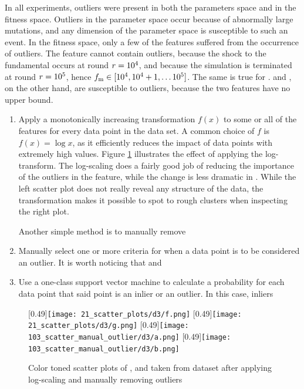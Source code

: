 In all experiments, outliers were present in both the parameters space and in the fitness space. Outliers in the parameter space occur because of abnormally large mutations, and any dimension of the parameter space is susceptible to such an event. In the fitness space, only a few of the features suffered from the occurrence of outliers. The feature \roundstable cannot contain outliers, because the shock to the fundamental occurs at round $r = 10^4$, and because the simulation is terminated at round $r = 10^5$, hence $f_\text{m} \in [10^4,10^4+1,\hdots 10^5]$. The same is true for \timetoreachnewfundamental. \stdev and \overshoot, on the other hand, are susceptible to outliers, because the two features have no upper bound.


\begin{enumerate}
\item Apply a monotonically increasing transformation $f(x)$ to some or all of the features for every data point in the data set. A common choice of $f$ is $f(x) = \log x$, as it efficiently reduces the impact of data points with extremely high values. Figure \ref{figure:scatter_log_transform} illustrates the effect of applying the log-transform. The log-scaling does a fairly good job of reducing the importance of the outliers in the \stdev feature, while the change is less dramatic in \timetoreachnewfundamental. While the left scatter plot does not really reveal any structure of the data, the transformation makes it possible to spot to rough clusters when inspecting the right plot.

Another simple method is to manually remove 
\item Manually select one or more criteria for when a data point is to be considered an outlier. It is worth noticing that \overshoot and \stdev 
\item Use a one-class support vector machine to calculate a probability for each data point that said point is an inlier or an outlier. In this case, inliers 
\end{enumerate}

\begin{figure}\label{figure:scatter_log_transform}
[0.49\linewidth]{\texttt{[image: 21\_scatter\_plots/d3/f.png]}}
[0.49\linewidth]{\texttt{[image: 21\_scatter\_plots/d3/g.png]}}
[0.49\linewidth]{\texttt{[image: 103\_scatter\_manual\_outlier/d3/a.png]}}
[0.49\linewidth]{\texttt{[image: 103\_scatter\_manual\_outlier/d3/b.png]}}
\caption{Color toned scatter plots of \timetoreachnewfundamental, \stdev and \roundstable taken from dataset \dthree after applying log-scaling and manually removing outliers}
\end{figure}


